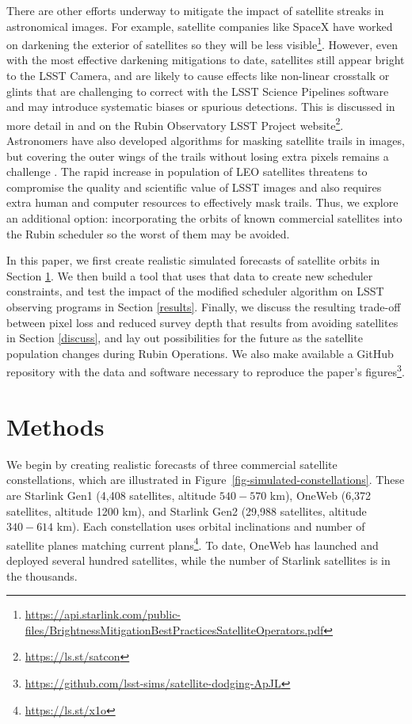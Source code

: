 \documentclass[twocolumn]{aastex631}
\begin{document}
There are other efforts underway to mitigate the impact of satellite streaks in astronomical images. For example, satellite companies like SpaceX have worked on darkening the exterior of satellites so they will be less visible\footnote{\url{https://api.starlink.com/public-files/BrightnessMitigationBestPracticesSatelliteOperators.pdf}}. However, even with the most effective darkening mitigations to date, satellites still appear bright to the LSST Camera, and are likely to cause effects like non-linear crosstalk or glints that are challenging to correct with the LSST Science Pipelines software and may introduce systematic biases or spurious detections. This is discussed in more detail in \citet{tyson20} and on the Rubin Observatory LSST Project website\footnote{\url{https://ls.st/satcon}}. Astronomers have also developed algorithms for masking satellite trails in images, but covering the outer wings of the trails without losing extra pixels remains a challenge \citep{hasan22}. The rapid increase in population of LEO satellites threatens to compromise the quality and scientific value of LSST images and also requires extra human and computer resources to effectively mask trails. Thus, we explore an additional option: incorporating the orbits of known commercial satellites into the Rubin scheduler so the worst of them may be avoided.

In this paper, we first create realistic simulated forecasts of satellite orbits in Section \ref{method}. We then build a tool that uses that data to create new scheduler constraints, and test the impact of the modified scheduler algorithm on LSST observing programs in Section \ref{results}. Finally, we discuss the resulting trade-off between pixel loss and reduced survey depth that results from avoiding satellites in Section \ref{discuss}, and lay out possibilities for the future as the satellite population changes during Rubin Operations. We also make available a GitHub repository with the data and software necessary to reproduce the paper's figures\footnote{\url{https://github.com/lsst-sims/satellite-dodging-ApJL}}.


\section{Methods}\label{method}

We begin by creating realistic forecasts of three commercial satellite constellations, which are illustrated in Figure~\ref{fig-simulated-constellations}. These are Starlink Gen1 (4,408 satellites, altitude $540-570$ km), OneWeb (6,372 satellites, altitude 1200 km), and Starlink Gen2 (29,988 satellites, altitude $340-614$ km). Each constellation uses orbital inclinations and number of satellite planes matching current plans\footnote{\url{https://ls.st/x1o}}. To date, OneWeb has launched and deployed several hundred satellites, while the number of Starlink satellites is in the thousands.
\end{document}
